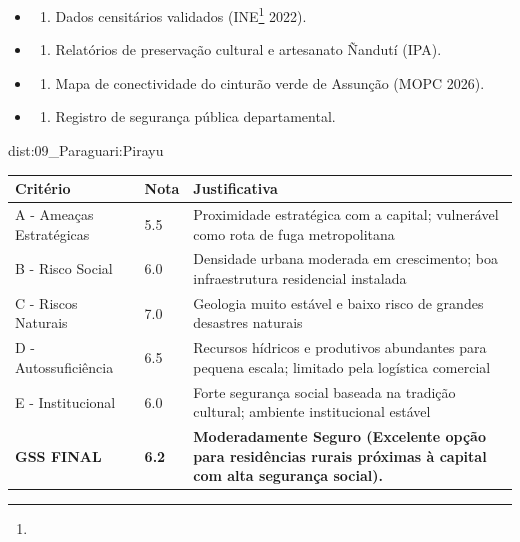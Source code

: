 {\begin{itemize}
\tightlist
\item
  \begin{enumerate}
  \def\labelenumi{\arabic{enumi})}
  \tightlist
  \item
    Dados censitários validados (INE\footnote{\fineINE} 2022).
  \end{enumerate}
\item
  \begin{enumerate}
  \def\labelenumi{\arabic{enumi})}
  \setcounter{enumi}{1}
  \tightlist
  \item
    Relatórios de preservação cultural e artesanato Ñandutí (IPA).
  \end{enumerate}
\item
  \begin{enumerate}
  \def\labelenumi{\arabic{enumi})}
  \setcounter{enumi}{2}
  \tightlist
  \item
    Mapa de conectividade do cinturão verde de Assunção (MOPC 2026).
  \end{enumerate}
\item
  \begin{enumerate}
  \def\labelenumi{\arabic{enumi})}
  \setcounter{enumi}{3}
  \tightlist
  \item
    Registro de segurança pública departamental.
  \end{enumerate}
\end{itemize}}{dist:09_Paraguari:Pirayu}
\begin{table}[ht!]
\small \begin{tabular}{p{3.0cm}p{0.8cm}p{6.0cm}} \toprule
\textbf{Critério} & \textbf{Nota} & \textbf{Justificativa} \\ \midrule
A - Ameaças Estratégicas & 5.5 & Proximidade estratégica com a capital; vulnerável como rota de fuga metropolitana \\
B - Risco Social & 6.0 & Densidade urbana moderada em crescimento; boa infraestrutura residencial instalada \\
C - Riscos Naturais & 7.0 & Geologia muito estável e baixo risco de grandes desastres naturais \\
D - Autossuficiência & 6.5 & Recursos hídricos e produtivos abundantes para pequena escala; limitado pela logística comercial \\
E - Institucional & 6.0 & Forte segurança social baseada na tradição cultural; ambiente institucional estável \\
\midrule \textbf{GSS FINAL} & \textbf{6.2} & \textbf{Moderadamente Seguro (Excelente opção para residências rurais próximas à capital com alta segurança social).} \\ \bottomrule \end{tabular}
\end{table}
